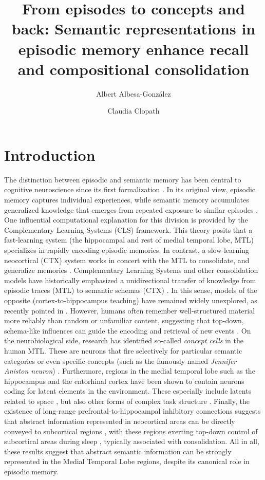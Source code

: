 \documentclass{article}
\title{From episodes to concepts and back: Semantic representations in episodic memory enhance recall and compositional consolidation}
\author[1]{Albert Albesa-González}
\author[1]{Claudia Clopath}
\affil[1]{Department of Bioengineering, Imperial College London, London, UK}
\begin{document}
\maketitle
\begin{abstract}
\noindent 
\end{abstract}
\section*{Introduction}
The distinction between episodic and semantic memory has been central to cognitive neuroscience since its first formalization . In its original view, episodic memory captures individual experiences, while semantic memory accumulates generalized knowledge that emerges from repeated exposure to similar episodes . One influential computational explanation for this division is provided by the Complementary Learning Systems (CLS) framework. This theory posits that a fast-learning system (the hippocampal and rest of medial temporal lobe, MTL) specializes in rapidly encoding episodic memories. In contrast, a slow-learning neocortical (CTX) system works in concert with the MTL to consolidate, and generalize memories .
\newline\newline
Complementary Learning Systems and other consolidation models have historically emphasized a unidirectional transfer of knowledge from episodic traces (MTL) to semantic schemas (CTX) . In this sense, models of the opposite (cortex-to-hippocampus teaching) have remained widely unexplored, as recently pointed in . However, humans often remember well-structured material more reliably than random or unfamiliar content, suggesting that top-down, schema-like influences can guide the encoding and retrieval of new events . On the neurobiological side, research has identified so-called \textit{concept cells} in the human MTL. These are neurons that fire selectively for particular semantic categories or even specific concepts (such as the famously named \textit{Jennifer Aniston neuron}) . Furthermore, regions in the medial temporal lobe such as the hippocampus and the entorhinal cortex have been shown to contain neurons coding for latent elements in the environment. These especially include latents related to space , but also other forms of complex task structure . Finally, the existence of long-range prefrontal-to-hippocampal inhibitory connections suggests that abstract information represented in neocortical areas can be directly conveyed to subcortical regions , with these regions exerting top-down control of subcortical areas during sleep , typically associated with consolidation. All in all, these results suggest that abstract semantic information can be strongly represented in the Medial Temporal Lobe regions, despite its canonical role in episodic memory.
\end{document}
